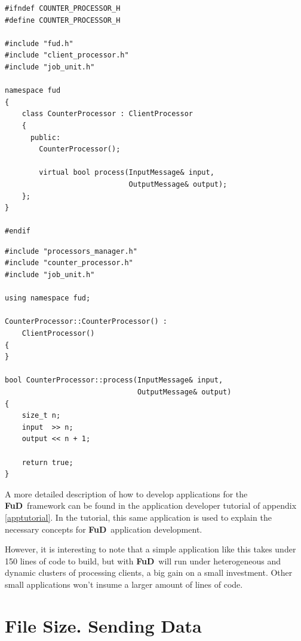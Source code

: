 \documentclass[a4paper,12pt,english]{report}
\newcommand{\fud}{\textbf{FuD}}
\newcommand{\CP}{\texttt{ClientProcessor}}
\begin{document}
\begin{table}[!htb]
\lstset{language=C++}
\begin{lstlisting}[frame=single]
#ifndef COUNTER_PROCESSOR_H
#define COUNTER_PROCESSOR_H

#include "fud.h"
#include "client_processor.h"
#include "job_unit.h"

namespace fud
{
    class CounterProcessor : ClientProcessor
    {
      public:
        CounterProcessor();

        virtual bool process(InputMessage& input, 
                             OutputMessage& output);
    };
}

#endif
\end{lstlisting}
\centering \caption{Header file for the \texttt{Counter} \CP.} \label{counterprochdr}
\end{table}


\begin{table}[!htb]
\lstset{language=C++}%
\begin{lstlisting}[frame=single]
#include "processors_manager.h"
#include "counter_processor.h"
#include "job_unit.h"

using namespace fud;

CounterProcessor::CounterProcessor() :
    ClientProcessor()
{
}

bool CounterProcessor::process(InputMessage& input, 
                               OutputMessage& output)
{
    size_t n;
    input  >> n;
    output << n + 1;

    return true;
}
\end{lstlisting}
\centering \caption{Implementation of the \texttt{Counter} \CP.} \label{counterprocessor}
\end{table}

A more detailed description of how to develop applications for the \fud \ framework can be found in the application developer tutorial of appendix \ref{apptutorial}. In the tutorial, this same application is used to explain the necessary concepts for \fud \ application development.

However, it is interesting to note that a simple application like this takes under 150 lines of code to build, but with \fud \ will run under heterogeneous and dynamic clusters of processing clients, a big gain on a small investment. Other small applications won't insume a larger amount of lines of code.

\section{File Size. Sending Data}
\end{document}
